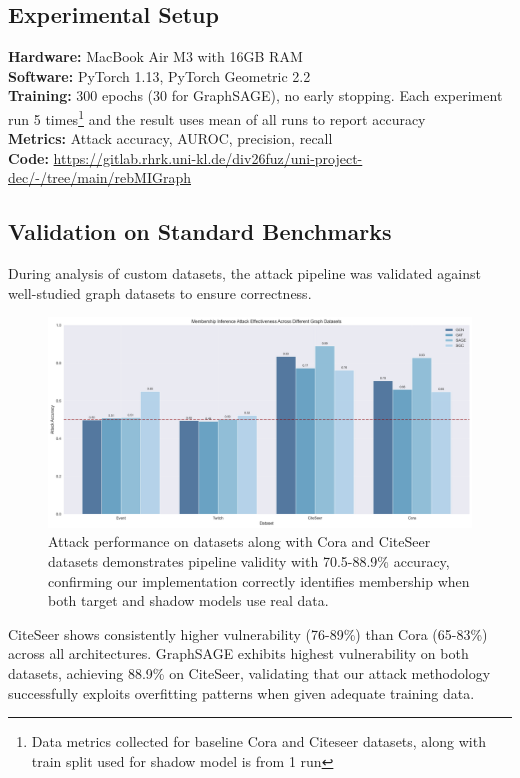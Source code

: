 \documentclass{article}
\begin{document}
\subsection{Experimental Setup}
\textbf{Hardware:} MacBook Air M3 with 16GB RAM\\
\textbf{Software:} PyTorch 1.13, PyTorch Geometric 2.2\\
\textbf{Training:} 300 epochs (30 for GraphSAGE), no early stopping. Each experiment run 5 times\footnote{Data metrics collected for baseline Cora and Citeseer datasets, along with train split used for shadow model is from 1 run} and the result uses mean of all runs to report accuracy\\
\textbf{Metrics:} Attack accuracy, AUROC, precision, recall\\
\textbf{Code:} \url{https://gitlab.rhrk.uni-kl.de/div26fuz/uni-project-dec/-/tree/main/rebMIGraph}

\subsection{Validation on Standard Benchmarks}
During analysis of custom datasets, the attack pipeline was validated against well-studied graph datasets to ensure correctness.

\begin{figure}[H]
\centering
\includegraphics[width=\textwidth]{../Results/visualizations/comprehensive_datasets_comparison.png}
\caption{Attack performance on datasets along with Cora and CiteSeer datasets demonstrates pipeline validity with 70.5-88.9\% accuracy, confirming our implementation correctly identifies membership when both target and shadow models use real data.}
\label{fig:baseline}
\end{figure}

CiteSeer shows consistently higher vulnerability (76-89\%) than Cora (65-83\%) across all architectures. GraphSAGE exhibits highest vulnerability on both datasets, achieving 88.9\% on CiteSeer, validating that our attack methodology successfully exploits overfitting patterns when given adequate training data.
\end{document}
